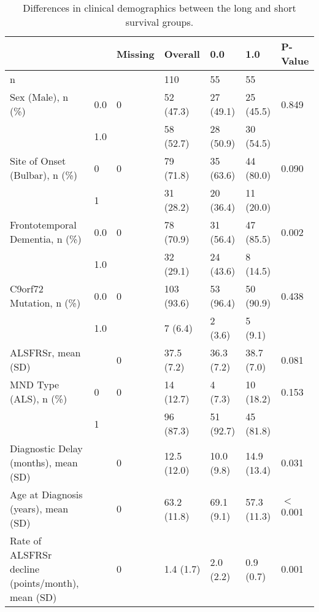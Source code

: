 \begin{table}
    \centering
    \caption{Differences in clinical demographics between the long and short survival groups.}
    \begin{tabular}{lllllll}
    \hline
                                                       &     & Missing   & Overall     & 0.0        & 1.0         & P-Value   \\
    \hline
     n                                                 &     &           & 110         & 55         & 55          &           \\
     Sex (Male), n (\%)                                 & 0.0 & 0         & 52 (47.3)   & 27 (49.1)  & 25 (45.5)   & 0.849     \\
                                                       & 1.0 &           & 58 (52.7)   & 28 (50.9)  & 30 (54.5)   &           \\
     Site of Onset (Bulbar), n (\%)                     & 0   & 0         & 79 (71.8)   & 35 (63.6)  & 44 (80.0)   & 0.090     \\
                                                       & 1   &           & 31 (28.2)   & 20 (36.4)  & 11 (20.0)   &           \\
     Frontotemporal Dementia, n (\%)                    & 0.0 & 0         & 78 (70.9)   & 31 (56.4)  & 47 (85.5)   & 0.002     \\
                                                       & 1.0 &           & 32 (29.1)   & 24 (43.6)  & 8 (14.5)    &           \\
     C9orf72 Mutation, n (\%)                           & 0.0 & 0         & 103 (93.6)  & 53 (96.4)  & 50 (90.9)   & 0.438     \\
                                                       & 1.0 &           & 7 (6.4)     & 2 (3.6)    & 5 (9.1)     &           \\
     ALSFRSr, mean (SD)                                &     & 0         & 37.5 (7.2)  & 36.3 (7.2) & 38.7 (7.0)  & 0.081     \\
     MND Type (ALS), n (\%)                             & 0   & 0         & 14 (12.7)   & 4 (7.3)    & 10 (18.2)   & 0.153     \\
                                                       & 1   &           & 96 (87.3)   & 51 (92.7)  & 45 (81.8)   &           \\
     Diagnostic Delay (months), mean (SD)              &     & 0         & 12.5 (12.0) & 10.0 (9.8) & 14.9 (13.4) & 0.031     \\
     Age at Diagnosis (years), mean (SD)               &     & 0         & 63.2 (11.8) & 69.1 (9.1) & 57.3 (11.3) & \ensuremath{<}0.001    \\
     Rate of ALSFRSr decline (points/month), mean (SD) &     & 0         & 1.4 (1.7)   & 2.0 (2.2)  & 0.9 (0.7)   & 0.001     \\
    \hline
    \end{tabular}
\end{table}

